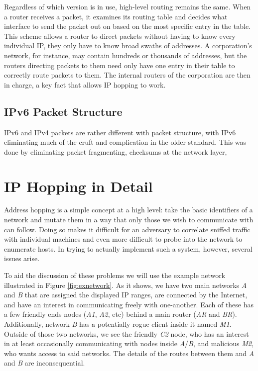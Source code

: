 \par Regardless of which version is in use, high-level routing remains the same. When a router receives a packet, it examines its routing table and decides what interface to send the packet out on based on the most specific entry in the table. This scheme allows a router to direct packets without having to know every individual IP, they only have to know broad swaths of addresses. A corporation's network, for instance, may contain hundreds or thousands of addresses, but the routers directing packets to them need only have one entry in their table to correctly route packets to them. The internal routers of the corporation are then in charge, a key fact that allows IP hopping to work.

\subsection{IPv6 Packet Structure}
\label{sec:ipv6}
\par IPv6 and IPv4 packets are rather different with packet structure, with IPv6 eliminating much of the cruft and complication in the older standard. This was done by eliminating packet fragmenting, checksums at the network layer, 

\section{IP Hopping in Detail}
\par Address hopping is a simple concept at a high level: take the basic identifiers of a network and mutate them in a way that only those we wish to communicate with can follow. Doing so makes it difficult for an adversary to correlate sniffed traffic with individual machines and even more difficult to probe into the network to enumerate hosts. In trying to actually implement such a system, however, several issues arise. 

\par To aid the discussion of these problems we will use the example network illustrated in Figure \ref{fig:exnetwork}. As it shows, we have two main networks \textit{A} and \textit{B} that are assigned the displayed IP ranges, are connected by the Internet, and have an interest in communicating freely with one-another. Each of these has a few friendly ends nodes (\textit{A1}, \textit{A2}, etc) behind a main router (\textit{AR} and \textit{BR}). Additionally, network \textit{B} has a potentially rogue client inside it named \textit{M1}. Outside of those two networks, we see the friendly \textit{C2} node, who has an interest in at least occasionally communicating with nodes inside \textit{A}/\textit{B}, and malicious \textit{M2}, who wants access to said networks. The details of the routes between them and \textit{A} and \textit{B} are inconsequential.

